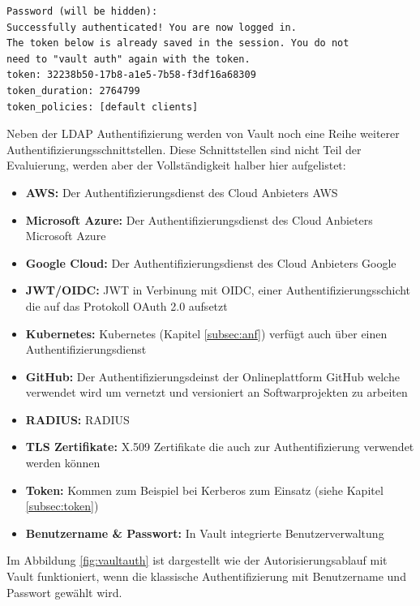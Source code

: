 \documentclass[
book,
a4paper,   
titlepage,  
halfparskip,
12pt        
]{scrartcl}
\begin{document}
\begin{onehalfspacing}
\begin{lstlisting}[caption={[\acs{LDAP} Authentifizierung] Kommandozeilenausgabe nach erfolgreicher Authentifizierung durch \acs{LDAP}}, label=lst:auth, captionpos=b, basicstyle=\ttfamily] 
Password (will be hidden):
Successfully authenticated! You are now logged in.
The token below is already saved in the session. You do not
need to "vault auth" again with the token.
token: 32238b50-17b8-a1e5-7b58-f3df16a68309
token_duration: 2764799
token_policies: [default clients]
\end{lstlisting}

Neben der LDAP Authentifizierung werden von Vault noch eine Reihe weiterer Authentifizierungsschnittstellen. Diese Schnittstellen sind nicht Teil der Evaluierung, werden aber der Vollständigkeit halber hier aufgelistet:\cite{vaultauth}
\begin{itemize}
	\item \textbf{\ac{AWS}:} Der Authentifizierungsdienst des Cloud Anbieters \ac{AWS}
	\item \textbf{Microsoft Azure:} Der Authentifizierungsdienst des Cloud Anbieters Microsoft Azure
	\item \textbf{Google Cloud:} Der Authentifizierungsdienst des Cloud Anbieters Google
	\item \textbf{\acs{JWT}/\acs{OIDC}:} \ac{JWT} in Verbinung mit \ac{OIDC}, einer Authentifizierungsschicht die auf das Protokoll OAuth 2.0 aufsetzt
	\item \textbf{Kubernetes:} Kubernetes (Kapitel \vref{subsec:anf}) verfügt auch über einen Authentifizierungsdienst
	\item \textbf{GitHub:} Der Authentifizierungsdeinst der Onlineplattform GitHub welche verwendet wird um vernetzt und versioniert an Softwarprojekten zu arbeiten
	\item \textbf{\acs{RADIUS}:} \ac{RADIUS} 
	\item \textbf{\acs{TLS} Zertifikate:} X.509 Zertifikate die auch zur Authentifizierung verwendet werden können
	\item \textbf{Token:} Kommen zum Beispiel bei Kerberos zum Einsatz (siehe Kapitel \vref{subsec:token})
	\item \textbf{Benutzername \& Passwort:} In Vault integrierte Benutzerverwaltung
\end{itemize}

Im Abbildung \vref{fig:vaultauth} ist dargestellt wie der Autorisierungsablauf mit Vault funktioniert, wenn die klassische Authentifizierung mit Benutzername und Passwort gewählt wird.


\end{onehalfspacing}
\end{document}
